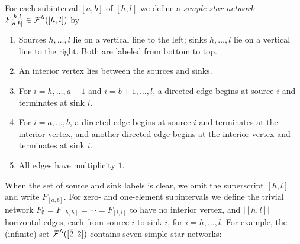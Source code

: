 \documentclass[11pt]{article}
\theoremstyle{definition}
\numberwithin{equation}{section}
\begin{document}
For each subinterval $[a,b]$ of $[h,l]$ we define a {\em simple star network}
$\smash{F_{[a,b]}^{[h,l]}} \in \mathcal F^{\mathsf{A}}([h,l])$ by
\begin{enumerate}
\item Sources $h,\dotsc,l$ lie on a vertical line to the left;
  sinks $h,\dotsc,l$ lie on a vertical line to the right.
  Both are labeled from bottom to top.
\item An interior vertex lies between the sources and sinks.
\item For $i = h, \dotsc, a-1$ and $i = b+1, \dotsc, l$, a directed edge
  begins at source $i$ and terminates at sink $i$.
\item For $i = a, \dotsc, b$, a directed edge begins at source $i$ and
  terminates at the interior vertex, and another directed edge begins
  at the interior vertex and terminates at sink $i$.
\item All edges have multiplicity $1$.
\end{enumerate}
When the set of source and sink labels is clear,
we omit the superscript $[h,l]$ and write $F_{[a,b]}$.
For zero- and one-element subintervals
we define the trivial network $F_{\emptyset} = F_{[h,h]} = \cdots = F_{[l,l]}$
to have no interior vertex, and $|[h,l]|$ horizontal edges, each from source $i$
to sink $i$, for $i = h,\dotsc,l$.
For example,
the (infinite) set $\mathcal F^{\mathsf{A}}([\overline{2}, 2])$ contains
seven simple star networks:
\end{document}
